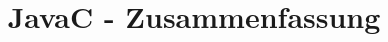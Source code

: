 \newcommand{\titleinfo}{JavaC - Zusammenfassung}
\newcommand{\authorinfo}{Christina van der Geest}

 

\usepackage{pdfpages}


	

	\title{\Huge{\titleinfo}}
	\maketitle
	\tableofcontents
	\raggedbottom

	
	\newpage
		
	


